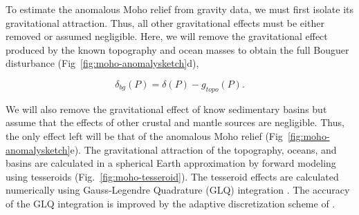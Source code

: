 To estimate the anomalous Moho relief from gravity data,
we must first isolate its gravitational attraction.
Thus, all other gravitational effects
must be either removed or assumed negligible.
Here, we will remove the gravitational effect produced by the known topography
and ocean masses to obtain the full Bouguer disturbance
(Fig~\ref{fig:moho-anomalysketch}d),

\begin{equation}
    \delta_{bg}(P) = \delta(P) - g_{topo}(P).
    \label{eq:moho-bouguer}
\end{equation}

\noindent
We will also remove the gravitational effect of know sedimentary basins
but assume that the effects of
other crustal and mantle sources are negligible.
Thus, the only effect left will be that of the anomalous Moho relief
(Fig~\ref{fig:moho-anomalysketch}e).
The gravitational attraction of the topography, oceans, and basins are
calculated in a spherical Earth approximation by forward modeling using
tesseroids (Fig.~\ref{fig:moho-tesseroid}).
The tesseroid effects are calculated numerically using
Gauss-Legendre Quadrature (GLQ) integration \citep{asgharzadeh2007}.
The accuracy of the GLQ integration is improved by the adaptive discretization
scheme of \citet{uieda2016}.


